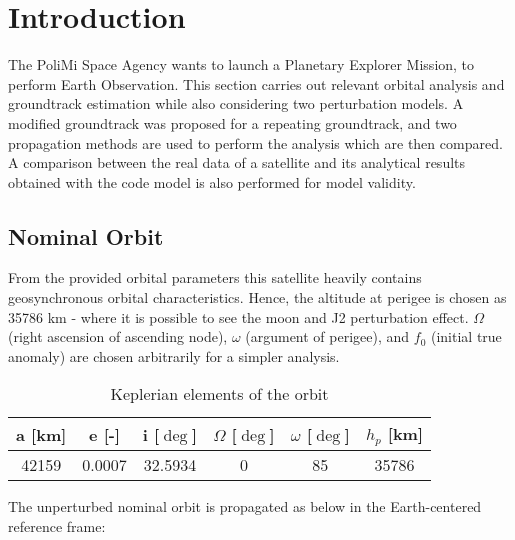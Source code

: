 \section{Introduction}
\label{sec:introduction_cap2}

The PoliMi Space Agency wants to launch a Planetary Explorer Mission, to  perform  Earth Observation. This section carries out relevant orbital analysis and groundtrack estimation while also considering two perturbation models. A modified groundtrack was proposed for a repeating groundtrack, and two propagation methods are used to perform the analysis which are then compared. A comparison between the real data of a satellite and its analytical results obtained with the code model is also performed for model validity.


\subsection{Nominal Orbit}

From the provided orbital parameters this satellite heavily contains geosynchronous orbital characteristics. Hence, the altitude at perigee is chosen as 35786 km \cite{perigee_alt} - where it is possible to see the moon and J2 perturbation effect. $\Omega$ (right ascension of ascending node), $\omega$ (argument of perigee), and $f_0$ (initial true anomaly) are chosen arbitrarily for a simpler analysis.

\begin{table}[ht]
	\centering
	\label{tab:keplerian_elements}
	\begin{tabular}{|c|c|c|c|c|c|}
		\hline
		a [km] & e [-] & i [$\deg$] & $\Omega$ [$\deg$] & $\omega$ [$\deg$] & $h_p$ [km] \\
		\hline
		42159 & 0.0007 & 32.5934 & 0 & 85 & 35786 \\
		\hline
	\end{tabular}
	\caption{Keplerian elements of the orbit}
\end{table}

The unperturbed nominal orbit is propagated as below in the Earth-centered reference frame:

